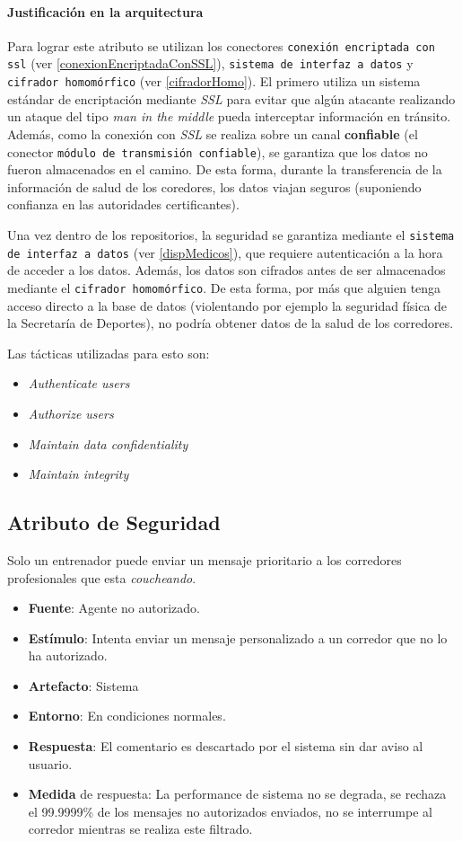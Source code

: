 \paragraph{Justificación en la arquitectura}
Para lograr este atributo se utilizan los conectores \texttt{conexión encriptada con ssl} (ver \ref{conexionEncriptadaConSSL}),  \texttt{sistema de interfaz a datos} y \texttt{cifrador homomórfico} (ver \ref{cifradorHomo}). El primero utiliza un sistema estándar de encriptación mediante \emph{SSL} para evitar que algún atacante realizando un ataque del tipo \emph{man in the middle} pueda interceptar información en tránsito. Además, como la conexión con \emph{SSL} se realiza sobre un canal \textbf{confiable} (el conector \texttt{módulo de transmisión confiable}), se garantiza que los datos no fueron almacenados en el camino. De esta forma, durante la transferencia de la información de salud de los coredores, los datos viajan seguros (suponiendo confianza en las autoridades certificantes). 

Una vez dentro de los repositorios, la seguridad se garantiza mediante el \texttt{sistema de interfaz a datos} (ver \ref{dispMedicos}), que requiere autenticación a la hora de acceder a los datos. Además, los datos son cifrados antes de ser almacenados mediante el \texttt{cifrador homomórfico}. De esta forma, por más que alguien tenga acceso directo a la base de datos (violentando por ejemplo la seguridad física de la Secretaría de Deportes), no podría obtener datos de la salud de los corredores.

Las tácticas utilizadas para esto son:
\begin{itemize}
  \item \emph{Authenticate users}
  \item \emph{Authorize users}
  \item \emph{Maintain data confidentiality}
  \item \emph{Maintain integrity}
\end{itemize}


\subsection{Atributo de Seguridad}
Solo un entrenador puede enviar un mensaje prioritario a los corredores profesionales que esta \emph{coucheando}.

\begin{itemize}
  \item \textbf{Fuente}: Agente no autorizado.
  \item \textbf{Estímulo}: Intenta enviar un mensaje personalizado a un corredor que no lo ha autorizado.
  \item \textbf{Artefacto}: Sistema
  \item \textbf{Entorno}: En condiciones normales.
  \item \textbf{Respuesta}: El comentario es descartado por el sistema sin dar aviso al usuario.
  \item \textbf{Medida} de respuesta: La performance de sistema no se degrada, se rechaza el 99.9999\% de los mensajes no autorizados enviados, no se interrumpe al corredor mientras se realiza este filtrado.
\end{itemize}

